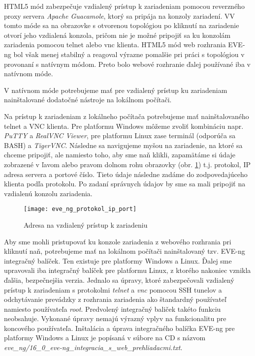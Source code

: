 \begin{enumerate}[noitemsep]
    HTML5 mód zabezpečuje vzdialený prístup k zariadeniam pomocou reverzného proxy servera \emph{Apache Guacamole}, ktorý sa pripája na konzoly zariadení. VV tomto móde sa na obrazovke s otvorenou topológiou po kliknutí na zariadenie otvorí jeho vzdialená konzola, pričom nie je možné pripojiť sa ku konzolám zariadenia pomocou telnet alebo vnc klienta. HTML5 mód web rozhrania EVE-ng bol však menej stabilný a reagoval výrazne pomalšie pri práci s topológiou v provonaní s natívnym módom. Preto bolo webové rozhranie ďalej používané iba v natívnom móde.
        
    V natívnom móde potrebujeme mať pre vzdialený prístup ku zariadeniam nainštalované dodatočné nástroje na lokálnom počítači. 
        
    Na prístup k zariadeniam z lokálneho počítača potrebujeme mať nainštalovaného telnet a VNC klienta. Pre platformu Windows môžeme zvoliť kombináciu napr. \emph{PuTTY} a \emph{RealVNC Viewer}, pre platformu Linux zase terminál (odporúča sa BASH) a \emph{TigerVNC}. Následne sa navigujeme myšou na zariadenie, na ktoré sa chceme pripojiť, ale namiesto toho, aby sme naň klikli, zapamätáme si údaje zobrazené v ľavom alebo pravom dolnom rohu obrazovky (obr. \ref{obr:eve_ng_protokol_ip_port}) t.j. protokol, IP adresa servera a portové číslo. Tieto údaje následne zadáme do zodpovedajúceho klienta podľa protokolu. Po zadaní správnych údajov by sme sa mali pripojiť na vzdialenú konzolu zariadenia.

\begin{figure}
    \centering
    \texttt{[image: eve\_ng\_protokol\_ip\_port]}
    \caption{Adresa na vzdialený prístup k zariadeniu}
    \label{obr:eve_ng_protokol_ip_port}
\end{figure}

    Aby sme mohli pristupovať ku konzole zariadenia z webového rozhrania pri kliknutí naň, potrebujeme mať na lokálnom počítači nainštalovaný tzv. EVE-ng integračný balíček. Ten existuje pre platformy Windows a Linux. Ďalej sme upravovali iba integračný balíček pre platformu Linux, z ktorého nakoniec vznikla ďalšia, bezpečnejšia verzia. Jednalo sa úpravy, ktoré zabezpečovali vzdialený prístup k zariadeniam s protokolmi \emph{telnet} a \emph{vnc} pomocou SSH tunelov a odchytávanie prevádzky z rozhrania zariadenia ako štandardný používateľ namiesto používateľa \emph{root}. Predvolený integračný baliček takéto funkciu neobsahuje. Vykonané úpravy nemajú výrazný vplyv na funkcionalitu pre koncového používateľa. Inštalácia a úprava integračného balíčka EVE-ng pre platformy Windows a Linux je popísaná v súbore na CD s názvom \\
    \emph{eve\_ng/16\_0\_eve-ng\_integracia\_s\_web\_prehliadacmi.txt}.

\end{enumerate}

